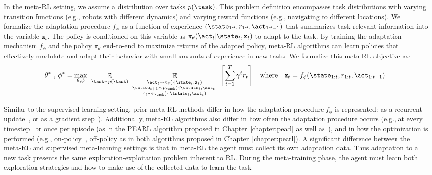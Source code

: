 In the meta-RL setting, we assume a distribution over tasks $p(\task)$. 
This problem definition encompasses task distributions with varying transition functions (e.g., robots with different dynamics) and varying reward functions (e.g., navigating to different locations).
We formalize the adaptation procedure $f_\phi$ as a function of experience $( \state_{1:t}, r_{1:t}, \act_{1:t-1} )$ that summarizes task-relevant information into the variable $\mathbf{z}_t$.
The policy is conditioned on this variable as $\pi_\theta(\act_t|\state_t, \mathbf{z}_t)$ to adapt to the task. 
By training the adaptation mechanism $f_\phi$ and the policy $\pi_\theta$ end-to-end to maximize returns of the adapted policy, meta-RL algorithms can learn policies that effectively modulate and adapt their behavior with small amounts of experience in new tasks. 
We formalize this meta-RL objective as:
\begin{align}\vspace{-0.2in}
    \theta^*\text{ , } \phi^* = \max_{\theta,\phi} \hspace{4pt} \mathop{\mathbb{E}}_{\task \sim p(\task)} \hspace{4pt}
    \mathop{\mathbb{E}}_{\substack{
    \\ \act_t \sim \pi_\theta(\cdot|\state_t,\mathbf{z}_t) 
    \\ \tstate_{t+1} \sim p_\task(\cdot|\tstate_t,\act_t) 
    \\ r_t \sim r_\task(\cdot | \tstate_t, \act_t)
    }} \hspace{4pt}
    \left[ \sum_{t=1}^T  \gamma^t r_t \right]
    \hspace{10pt} \text{where} \hspace{10pt} \mathbf{z}_t = f_{\phi}(\state_{1:t}, r_{1:t}, \act_{1:t-1}).
    \label{eqn:meta-general}
\end{align}

Similar to the supervised learning setting, prior meta-RL methods differ in how the adaptation procedure $f_\phi$ is represented: as a recurrent update~\citep{duan2016rl, wang2016learning}, or as a gradient step~\citep{finn2017model}).
Additionally, meta-RL algorithms also differ in how often the adaptation procedure occurs (e.g., at every timestep~\citep{duan2016rl, zintgraf2019varibad} or once per episode (as in the PEARL algorithm proposed in Chapter~\ref{chapter:pearl} as well as~\citet{humplik2019meta}), and in how the optimization is performed (e.g., on-policy~\citep{duan2016rl}, off-policy as in both algorithms proposed in Chapter~\ref{chapter:pearl}). 
A significant difference between the meta-RL and supervised meta-learning settings is that in meta-RL the agent must collect its own adaptation data. 
Thus adaptation to a new task presents the same exploration-exploitation problem inherent to RL.
During the meta-training phase, the agent must learn both exploration strategies and how to make use of the collected data to learn the task.

